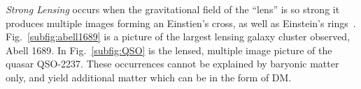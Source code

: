 \textit{Strong Lensing} occurs when the gravitational field of the ``lens'' is so strong it produces multiple images forming an Einstien's cross, as well as Einstein's rings~\cite{Einstein:1956zz}. Fig.~\ref{subfig:abell1689} is a picture of the largest lensing galaxy cluster observed, Abell 1689. In Fig.~\ref{subfig:QSO} is the lensed, multiple image picture of the quasar QSO-2237. These occurrences cannot be explained by baryonic matter only, and yield additional matter which can be in the form of DM.  

\begin{figure}
   \centering
    \begin{minipage}[c]{0.38\textwidth}
    \centering
    \end{minipage}
    \begin{minipage}[c]{0.4\textheight}%
	\centering    
\end{minipage}
\end{figure}
